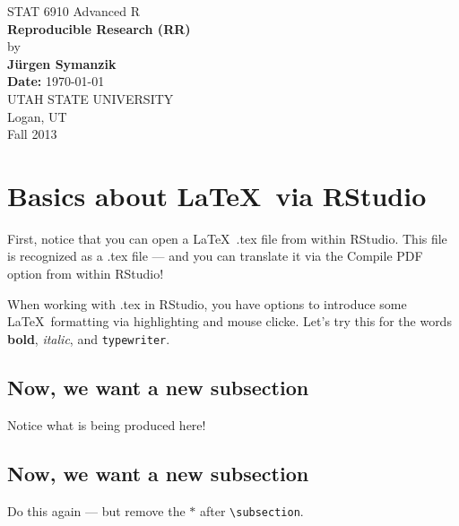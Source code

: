 \documentclass[12pt]{article}
\begin{document}
\begin{titlepage}

\begin{center}
{\large STAT 6910 Advanced R} \\[4cm]

{\LARGE \bf Reproducible Research (RR)} \\[1cm]
by \\[0.5cm]
{\bf J\"urgen Symanzik} \\[2.5cm]
{\bf Date:} \today \\[2cm]

UTAH STATE UNIVERSITY \\[0.5cm]
Logan, UT \\[0.5cm]
Fall 2013 \\[0.5cm]
\end{center}

\thispagestyle{empty}
\vfill
\end{titlepage}


\newpage 



\tableofcontents


\newpage



\section{Basics about \LaTeX\ via RStudio}

First, notice that you can open a \LaTeX\ .tex file from within RStudio.
This file is recognized as a .tex file --- and you can translate it 
via the Compile PDF option from within RStudio!

When working with .tex in RStudio, you have options to introduce
some \LaTeX\ formatting via highlighting and mouse clicke. Let's
try this for the words \textbf{bold}, \emph{italic}, and \texttt{typewriter}.


\subsection*{Now, we want a new subsection}

Notice what is being produced here!


\subsection{Now, we want a new subsection}

Do this again --- but remove the $*$ after \verb|\subsection|.
\end{document}
